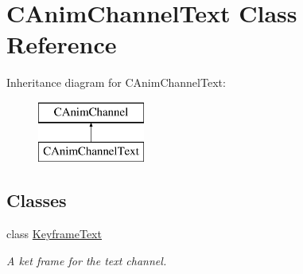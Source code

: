 \hypertarget{class_c_anim_channel_text}{\section{C\+Anim\+Channel\+Text Class Reference}
\label{class_c_anim_channel_text}
}
Inheritance diagram for C\+Anim\+Channel\+Text\+:\begin{figure}[H]
\begin{center}
\leavevmode
\includegraphics[height=2.000000cm]{class_c_anim_channel_text}
\end{center}
\end{figure}
\subsection*{Classes}
\begin{DoxyCompactItemize}
\item 
class \hyperlink{class_c_anim_channel_text_1_1_keyframe_text}{Keyframe\+Text}
\begin{DoxyCompactList}\small\item\em A ket frame for the text channel. \end{DoxyCompactList}\end{DoxyCompactItemize}
